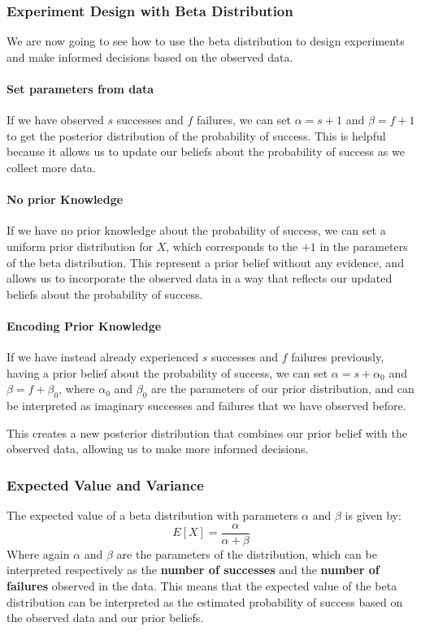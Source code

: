 \subsubsection{Experiment Design with Beta Distribution}
We are now going to see how to use the beta distribution to design experiments and make informed decisions based on the observed data.

\paragraph{Set parameters from data}
If we have observed $s$ successes and $f$ failures, we can set $\alpha = s + 1$ and $\beta = f + 1$ to get the posterior distribution of the probability of success.
This is helpful because it allows us to update our beliefs about the probability of success as we collect more data.

\paragraph{No prior Knowledge}
If we have no prior knowledge about the probability of success, we can set a uniform prior distribution for $X$, which corresponds to the $+1$ in the parameters of the beta distribution.
This represent a prior belief without any evidence, and allows us to incorporate the observed data in a way that reflects our updated beliefs about the probability of success.

\paragraph{Encoding Prior Knowledge}
If we have instead already experienced $s$ successes and $f$ failures previously, having a prior belief about the probability of success, we can set $\alpha = s + \alpha_0$ and $\beta = f + \beta_0$, 
where $\alpha_0$ and $\beta_0$ are the parameters of our prior distribution, and can be interpreted as imaginary successes and failures that we have observed before.

This creates a new posterior distribution that combines our prior belief with the observed data, allowing us to make more informed decisions.

\subsubsection{Expected Value and Variance}
The expected value of a beta distribution with parameters $\alpha$ and $\beta$ is given by:
\begin{equation}
    E[X] = \frac{\alpha}{\alpha + \beta}
\end{equation}
Where again $\alpha$ and $\beta$ are the parameters of the distribution, which can be interpreted respectively as the \textbf{number of successes} and the \textbf{number of failures} observed in the data.
This means that the expected value of the beta distribution can be interpreted as the estimated probability of success based on the observed data and our prior beliefs.

